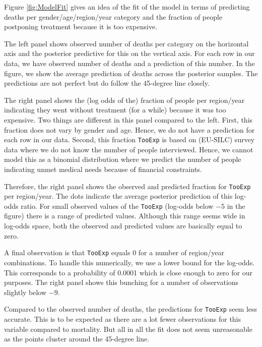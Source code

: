 \documentclass[a4paper,12pt]{article}
\begin{document}
Figure \ref{fig:ModelFit} gives an idea of the fit of the model in terms of predicting deaths per gender/age/region/year category and the fraction of people postponing treatment because it is too expensive.

The left panel shows observed number of deaths per category on the horizontal axis and the posterior predictive for this on the vertical axis. For each row in our data, we have observed number of deaths and a prediction of this number. In the figure, we show the average prediction of deaths across the posterior samples. The predictions are not perfect but do follow the 45-degree line closely.

The right panel shows the (log odds of the) fraction of people per region/year indicating they went without treatment (for a while) because it was too expensive. Two things are different in this panel compared to the left. First, this fraction does not vary by gender and age. Hence, we do not have a prediction for each row in our data. Second, this fraction \texttt{TooExp} is based on (EU-SILC) survey data where we do not know the number of people interviewed. Hence, we cannot model this as a binomial distribution where we predict the number of people indicating unmet medical needs because of financial constraints.

Therefore, the right panel shows the observed and predicted fraction for \texttt{TooExp} per region/year. The dots indicate the average posterior prediction of this log-odds ratio. For small observed values of the \texttt{TooExp} (log-odds below \(-5\) in the figure) there is a range of predicted values. Although this range seems wide in log-odds space, both the observed and predicted values are basically equal to zero.

A final observation is that \texttt{TooExp} equals 0 for a number of region/year combinations. To handle this numerically, we use a lower bound for the log-odds. This corresponds to a probability of 0.0001 which is close enough to zero for our purposes. The right panel shows this bunching for a number of observations slightly below \(-9\).

Compared to the observed number of deaths, the predictions for \texttt{TooExp} seem less accurate. This is to be expected as there are a lot fewer observations for this variable compared to mortality. But all in all the fit does not seem unreasonable as the points cluster around the 45-degree line.
\end{document}
